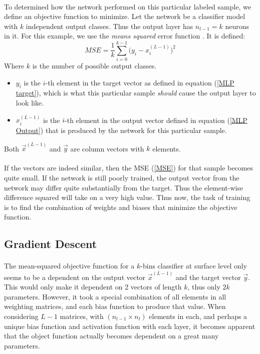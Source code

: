 \documentclass[12pt,letterpaper]{article}
\begin{document}
\paragraph*{}To determined how the network performed on this particular labeled sample, we define an objective function to minimize. Let the network be a classifier model with $k$ independent output classes. Thus the output layer has $n_{l-1} = k$ neurons in it. For this example, we use the \textit{means squared} error function \cite{James}. It is defined:
\begin{equation}
\label{MSE}
MSE = \frac{1}{k}\sum_{i=0}^{k-1} \Big( y_i - x^{(L-1)}_i \Big)^2
\end{equation}
Where $k$ is the number of possible output classes. 
\begin{itemize}

\item $y_i$ is the $i$-th element in the target vector as defined in equation (\ref{MLP target}), which is what this particular sample \textit{should} cause the output layer to look like. 
\item $x^{(L-1)}_i$ is the $i$-th element in the output vector defined in equation (\ref{MLP Output}) that is produced by the network for this particular sample. 
\end{itemize}
Both $\vec{x}^{(L-1)}$ and $\vec{y}$ are column vectors with $k$ elements.
\paragraph*{}If the vectors are indeed similar, then the MSE (\ref{MSE}) for that sample becomes quite small. If the network is still poorly trained, the output vector from the network may differ quite substantially from the target. Thus the element-wise difference squared will take on a very high value. Thus now, the task of training is to find the combination of weights and biases that minimize the objective function.


\subsection{Gradient Descent}
\paragraph*{}The mean-squared objective function for a $k$-bins classifier at surface level only seems to be a dependent on the output vector $\vec{x}^{(L-1)}$ and the target vector $\vec{y}$. This would only make it dependent on 2 vectors of length $k$, thus only $2k$ parameters. However, it took a special combination of all elements in all weighting matrices, and each bias function to produce that value. When considering $L-1$ matrices, with $(n_{l-1} \times n_l)$ elements in each, and perhaps a unique bias function and activation function with each layer, it becomes apparent that the object function actually becomes dependent on a great many parameters.
\end{document}
